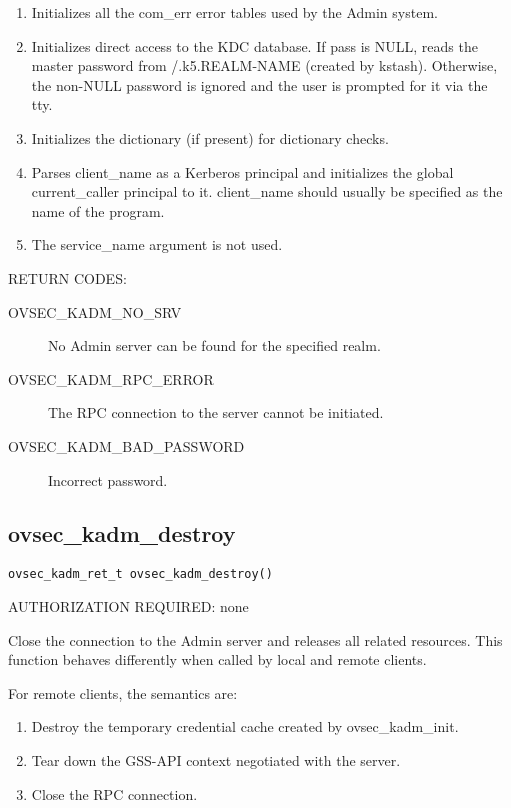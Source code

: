 \begin{enumerate}
\item Initializes all the com_err error tables used by the Admin
system.

\item Initializes direct access to the KDC database.  If pass is NULL,
reads the master password from /.k5.REALM-NAME (created by kstash).
Otherwise, the non-NULL password is ignored and the user is prompted
for it via the tty.

\item Initializes the dictionary (if present) for dictionary checks.

\item Parses client_name as a Kerberos principal and initializes the
global current_caller principal to it.  client_name should usually be
specified as the name of the program.

\item The service_name argument is not used.
\end{enumerate}

RETURN CODES: 

\begin{description}
\item[OVSEC_KADM_NO_SRV] No Admin server can be found for the
specified realm.

\item[OVSEC_KADM_RPC_ERROR] The RPC connection to the server cannot be
initiated.

\item[OVSEC_KADM_BAD_PASSWORD] Incorrect password.
\end{description}

\subsection{ovsec_kadm_destroy}

\begin{verbatim}
ovsec_kadm_ret_t ovsec_kadm_destroy()
\end{verbatim}

AUTHORIZATION REQUIRED: none

Close the connection to the Admin server and releases all related
resources.  This function behaves differently when called by local and
remote clients.

For remote clients, the semantics are:

\begin{enumerate}
\item Destroy the temporary credential cache created by
ovsec_kadm_init.

\item Tear down the GSS-API context negotiated with the server.

\item Close the RPC connection.
\end{enumerate}

